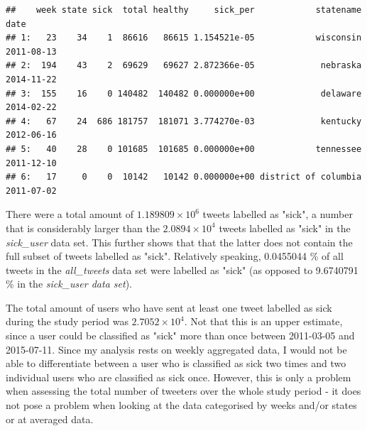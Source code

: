 \documentclass[11pt, a4paper]{report}\usepackage[]{graphicx}\usepackage[]{color}
\makeatletter
\newenvironment{kframe}{%
 \def\at@end@of@kframe{}%
 \ifinner\ifhmode%
  \def\at@end@of@kframe{\end{minipage}}%
  \begin{minipage}{\columnwidth}%
 \fi\fi%
 \def\FrameCommand##1{\hskip\@totalleftmargin \hskip-\fboxsep
 \colorbox{shadecolor}{##1}\hskip-\fboxsep
     \hskip-\linewidth \hskip-\@totalleftmargin \hskip\columnwidth}%
 \MakeFramed {\advance\hsize-\width
   \@totalleftmargin\z@ \linewidth\hsize
   \@setminipage}}%
 {\par\unskip\endMakeFramed%
 \at@end@of@kframe}
\newenvironment{knitrout}{}{} %
\makeatother
\begin{document}
\begin{knitrout}
\color{fgcolor}\begin{kframe}
\begin{verbatim}
##    week state sick  total healthy     sick_per            statename       date
## 1:   23    34    1  86616   86615 1.154521e-05            wisconsin 2011-08-13
## 2:  194    43    2  69629   69627 2.872366e-05             nebraska 2014-11-22
## 3:  155    16    0 140482  140482 0.000000e+00             delaware 2014-02-22
## 4:   67    24  686 181757  181071 3.774270e-03             kentucky 2012-06-16
## 5:   40    28    0 101685  101685 0.000000e+00            tennessee 2011-12-10
## 6:   17     0    0  10142   10142 0.000000e+00 district of columbia 2011-07-02
\end{verbatim}
\end{kframe}
\end{knitrout}

There were a total amount of \ensuremath{1.189809\times 10^{6}} tweets labelled as "sick", a number that is considerably larger than the \ensuremath{2.0894\times 10^{4}} tweets labelled as "sick" in the \textit{sick\_user} data set. This further shows that that the latter does not contain the full subset of tweets labelled as "sick". Relatively speaking, 0.0455044 \% of all tweets in the \textit{all\_tweets} data set were labelled as "sick" (as opposed to 9.6740791 \% in the \textit{sick\_user data set}).\newline

The total amount of users who have sent at least one tweet labelled as sick during the study period was \ensuremath{2.7052\times 10^{4}}. Not that this is an upper estimate, since a user could be classified as "sick" more than once between 2011-03-05 and 2015-07-11. Since my analysis rests on weekly aggregated data, I would not be able to differentiate between a user who is classified as sick two times and two individual users who are classified as sick once. However, this is only a problem when assessing the total number of tweeters over the whole study period - it does not pose a problem when looking at the data categorised by weeks and/or states or at averaged data.\newline
\end{document}
